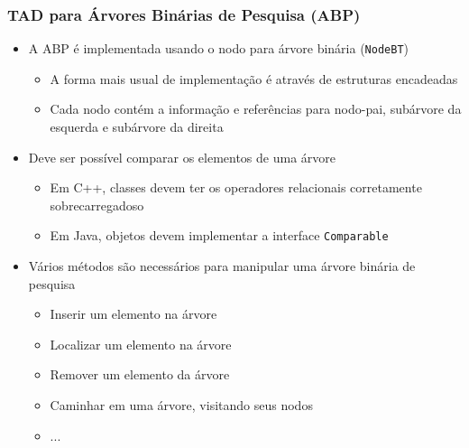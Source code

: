 \documentclass[aspectratio=169]{beamer}
\begin{document}
\begin{frame}\frametitle{TAD para Árvores Binárias de Pesquisa (ABP)}
\begin{itemize}
	\item A ABP é implementada usando o nodo para árvore binária (\texttt{NodeBT})
	\begin{itemize}
		\item A forma mais usual de implementação é através de estruturas encadeadas	
		\item Cada nodo contém a informação e referências para nodo-pai, subárvore da esquerda e subárvore da direita
	\end{itemize}
	\item Deve ser possível comparar os elementos de uma árvore
	\begin{itemize}
		\item Em C++, classes devem ter os operadores relacionais corretamente sobrecarregadoso
		\item Em Java, objetos devem implementar a interface \texttt{Comparable}
	\end{itemize}
	\item Vários métodos são necessários para manipular uma árvore binária de pesquisa
	\begin{itemize}
		\item Inserir um elemento na árvore
		\item Localizar um elemento na árvore
		\item Remover um elemento da árvore
		\item Caminhar em uma árvore, visitando seus nodos
		\item ...
	\end{itemize}
\end{itemize}
\end{frame}
\end{document}
